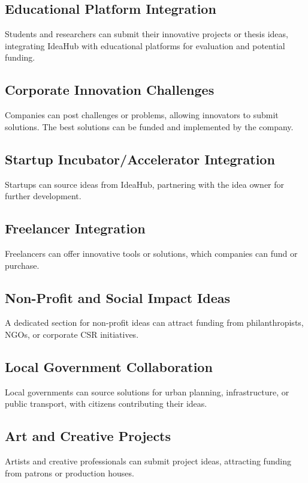 \documentclass{article}
\begin{document}
	\subsection{Educational Platform Integration}
	Students and researchers can submit their innovative projects or thesis ideas, integrating IdeaHub with educational platforms for evaluation and potential funding.
	
	\subsection{Corporate Innovation Challenges}
	Companies can post challenges or problems, allowing innovators to submit solutions. The best solutions can be funded and implemented by the company.
	
	\subsection{Startup Incubator/Accelerator Integration}
	Startups can source ideas from IdeaHub, partnering with the idea owner for further development.
	
	\subsection{Freelancer Integration}
	Freelancers can offer innovative tools or solutions, which companies can fund or purchase.
	
	\subsection{Non-Profit and Social Impact Ideas}
	A dedicated section for non-profit ideas can attract funding from philanthropists, NGOs, or corporate CSR initiatives.
	
	\subsection{Local Government Collaboration}
	Local governments can source solutions for urban planning, infrastructure, or public transport, with citizens contributing their ideas.
	
	\subsection{Art and Creative Projects}
	Artists and creative professionals can submit project ideas, attracting funding from patrons or production houses.
	
\end{document}
